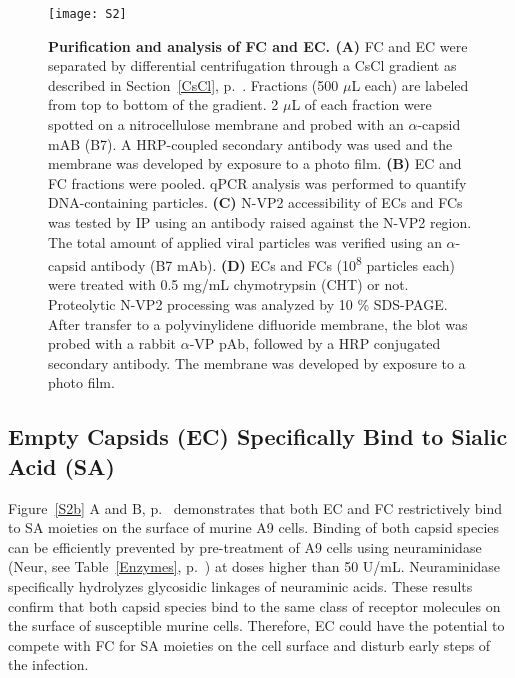 \begin{figure}
\centering
\texttt{[image: S2]} \\[0.3cm]
\caption[Purification and Analysis of FC and EC]
{\textbf{Purification and analysis of FC and EC. (A)} FC and EC were separated by differential centrifugation through a CsCl gradient as described in Section~\ref{CsCl}, p.~\pageref{CsCl}. Fractions (500 $\mu$L each) are labeled from top to bottom of the gradient. 2 $\mu$L of each fraction were spotted on a nitrocellulose membrane and probed with an $\alpha$-capsid mAB (B7). A HRP-coupled secondary antibody was used and the membrane was developed by exposure to a photo film. \textbf{(B)} EC and FC fractions were pooled. qPCR analysis was performed to quantify DNA-containing particles. \textbf{(C)} N-VP2 accessibility of ECs and FCs was tested by IP using an antibody raised against the N-VP2 region. The total amount of applied viral particles was verified using an $\alpha$-capsid antibody (B7 mAb). \textbf{(D)} ECs and FCs (10\textsuperscript{8} particles each) were treated with 0.5 mg/mL chymotrypsin (CHT) or not. Proteolytic N-VP2 processing was analyzed by 10 \% SDS-PAGE. After transfer to a polyvinylidene difluoride membrane, the blot was probed with a rabbit $\alpha$-VP pAb, followed by a HRP conjugated secondary antibody. The membrane was developed by exposure to a photo film.} 
\label{S2}
\end{figure}


\subsection{Empty Capsids (EC) Specifically Bind to Sialic Acid (SA)}


Figure~\ref{S2b} A and B, p.~\pageref{S2b} demonstrates that both EC and FC restrictively bind to SA moieties on the surface of murine A9 cells. Binding of both capsid species can be efficiently prevented by pre-treatment of A9 cells using neuraminidase (Neur, see Table~\ref{Enzymes}, p.~\pageref{Enzymes}) at doses higher than 50 U/mL. Neuraminidase specifically hydrolyzes glycosidic linkages of neuraminic acids. These results confirm that both capsid species bind to the same class of receptor molecules on the surface of susceptible murine cells. Therefore, EC could have the potential to compete with FC for SA moieties on the cell surface and disturb early steps of the infection.            
\renewcommand\thempfootnote{\arabic{mpfootnote}}


